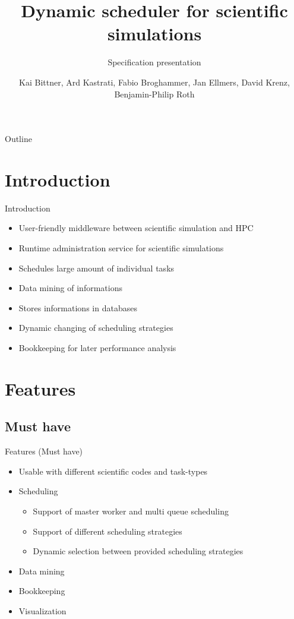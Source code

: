 \documentclass[18pt]{beamer}
\title[Specification presentation]{Dynamic scheduler for scientific simulations}
\subtitle{Specification presentation}
\author{Kai Bittner, Ard Kastrati, Fabio Broghammer, Jan Ellmers, David Krenz, Benjamin-Philip Roth}
\institute{Steinbuch Centre for Computing (SCC)}
\begin{document}

\begin{frame}
\titlepage
\end{frame}

\begin{frame}{Outline}
\tableofcontents
\end{frame}

\section{Introduction}
	\begin{frame}{Introduction}
		\begin{itemize}
			\pause
			\item User-friendly middleware between scientific simulation and HPC
			\pause
			\item Runtime administration service for scientific simulations
			\pause
			\item Schedules large amount of individual tasks
			\pause
			\item Data mining of informations
			\pause
			\item Stores informations in databases
			\pause
			\item Dynamic changing of scheduling strategies
			\pause
			\item Bookkeeping for later performance analysis
		\end{itemize}
	\end{frame}
	
\section{Features}
	\subsection{Must have}
	\begin{frame}{Features (Must have)}
		\begin{itemize}
			\pause
			\item Usable with different scientific codes and task-types
			\pause
			\item Scheduling	
				\begin{itemize}
					\item Support of master worker and multi queue scheduling
					\item Support of different scheduling strategies
					\item Dynamic selection between provided scheduling strategies
				\end{itemize}
				
			\pause
			\item Data mining
			\pause
			\item Bookkeeping
			\pause
			\item Visualization
		\end{itemize}
	\end{frame}
	
\end{document}
